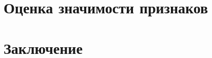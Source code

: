 \documentclass[14pt, a4paper, oneside]{extarticle}
\begin{document}
\section{Оценка значимости признаков}

\newpage




\section{Заключение}
\newpage
\end{document}

